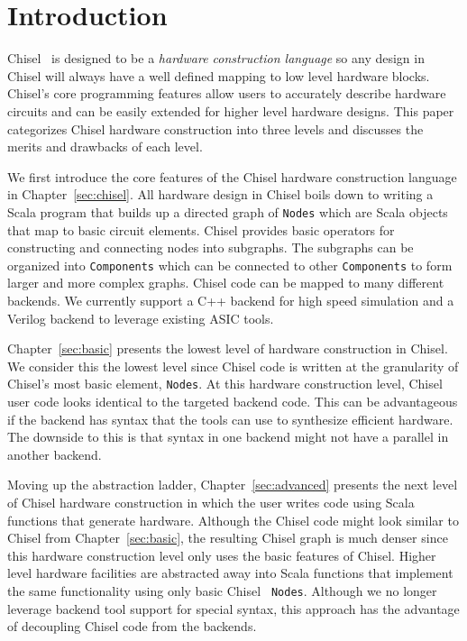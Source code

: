\section{Introduction}
\label{sec:intro}
Chisel~\cite{Bachrach:2012} is designed to be a {\it hardware construction language} so any
design in Chisel will always have a well defined mapping to low level
hardware blocks. Chisel's core programming features allow users to
accurately describe hardware circuits and can be easily extended for
higher level hardware designs. This paper categorizes Chisel hardware
construction into three levels and discusses the merits and drawbacks
of each level.

We first introduce the core features of the Chisel hardware
construction language in Chapter~\ref{sec:chisel}. All hardware design
in Chisel boils down to writing a Scala program that builds up a directed
graph of {\tt Nodes} which are Scala objects that map to basic circuit
elements. Chisel provides basic operators for constructing and
connecting nodes into subgraphs. The subgraphs can be organized into
{\tt Components} which can be connected to other {\tt Components} to
form larger and more complex graphs. Chisel code can be mapped to many
different backends. We currently support a C++ backend for high speed
simulation and a Verilog backend to leverage existing ASIC tools.

Chapter~\ref{sec:basic} presents the lowest level of hardware
construction in Chisel. We consider this the lowest level since
Chisel code is written at the granularity of Chisel's most basic
element, {\tt Nodes}. At this hardware construction level, Chisel user
code looks identical to the targeted backend code. This can be
advantageous if the backend has syntax that the tools can use to
synthesize efficient hardware. The downside to this is that syntax in
one backend might not have a parallel in another backend.

Moving up the abstraction ladder, Chapter~\ref{sec:advanced} presents
the next level of Chisel hardware construction in which the user
writes code using Scala functions that generate hardware. Although the
Chisel code might look similar to Chisel from Chapter~\ref{sec:basic},
the resulting Chisel graph is much denser since this hardware
construction level only uses the basic features of Chisel. Higher
level hardware facilities are abstracted away into Scala functions that
implement the same functionality using only basic Chisel {\tt
  Nodes}. Although we no longer leverage backend tool support for
special syntax, this approach has the advantage of decoupling Chisel
code from the backends.

